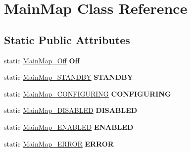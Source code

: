 \hypertarget{class_main_map}{\section{Main\-Map Class Reference}
\label{class_main_map}
}
\subsection*{Static Public Attributes}
\begin{DoxyCompactItemize}
\item 
\hypertarget{class_main_map_a5f49cd67858929c7acf05d8c3913de2c}{static \hyperlink{class_main_map___off}{Main\-Map\-\_\-\-Off} {\bfseries Off}}\label{class_main_map_a5f49cd67858929c7acf05d8c3913de2c}

\item 
\hypertarget{class_main_map_a4cfd7e77a69af196d17fdc76874677a5}{static \hyperlink{class_main_map___s_t_a_n_d_b_y}{Main\-Map\-\_\-\-S\-T\-A\-N\-D\-B\-Y} {\bfseries S\-T\-A\-N\-D\-B\-Y}}\label{class_main_map_a4cfd7e77a69af196d17fdc76874677a5}

\item 
\hypertarget{class_main_map_a0d9d3eec682073abf117c53ad8e2f03c}{static \hyperlink{class_main_map___c_o_n_f_i_g_u_r_i_n_g}{Main\-Map\-\_\-\-C\-O\-N\-F\-I\-G\-U\-R\-I\-N\-G} {\bfseries C\-O\-N\-F\-I\-G\-U\-R\-I\-N\-G}}\label{class_main_map_a0d9d3eec682073abf117c53ad8e2f03c}

\item 
\hypertarget{class_main_map_a87927a46a8f598a14c97ea9fcd7197b1}{static \hyperlink{class_main_map___d_i_s_a_b_l_e_d}{Main\-Map\-\_\-\-D\-I\-S\-A\-B\-L\-E\-D} {\bfseries D\-I\-S\-A\-B\-L\-E\-D}}\label{class_main_map_a87927a46a8f598a14c97ea9fcd7197b1}

\item 
\hypertarget{class_main_map_a38bddded4391d22e25b4de434414bbd0}{static \hyperlink{class_main_map___e_n_a_b_l_e_d}{Main\-Map\-\_\-\-E\-N\-A\-B\-L\-E\-D} {\bfseries E\-N\-A\-B\-L\-E\-D}}\label{class_main_map_a38bddded4391d22e25b4de434414bbd0}

\item 
\hypertarget{class_main_map_a4e620dd16def717873cb16484f0aa17b}{static \hyperlink{class_main_map___e_r_r_o_r}{Main\-Map\-\_\-\-E\-R\-R\-O\-R} {\bfseries E\-R\-R\-O\-R}}\label{class_main_map_a4e620dd16def717873cb16484f0aa17b}

\end{DoxyCompactItemize}


